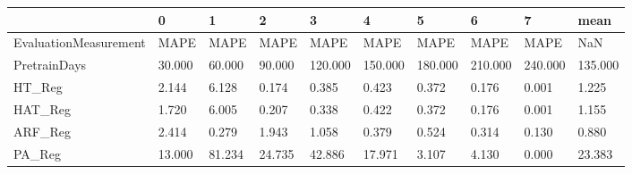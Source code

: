 \begin{tabular}{llllllllll}
\toprule
{} &      0 &      1 &      2 &       3 &       4 &       5 &       6 &       7 &    mean \\
\midrule
EvaluationMeasurement &   MAPE &   MAPE &   MAPE &    MAPE &    MAPE &    MAPE &    MAPE &    MAPE &     NaN \\
PretrainDays          & 30.000 & 60.000 & 90.000 & 120.000 & 150.000 & 180.000 & 210.000 & 240.000 & 135.000 \\
HT\_Reg                &  2.144 &  6.128 &  0.174 &   0.385 &   0.423 &   0.372 &   0.176 &   0.001 &   1.225 \\
HAT\_Reg               &  1.720 &  6.005 &  0.207 &   0.338 &   0.422 &   0.372 &   0.176 &   0.001 &   1.155 \\
ARF\_Reg               &  2.414 &  0.279 &  1.943 &   1.058 &   0.379 &   0.524 &   0.314 &   0.130 &   0.880 \\
PA\_Reg                & 13.000 & 81.234 & 24.735 &  42.886 &  17.971 &   3.107 &   4.130 &   0.000 &  23.383 \\
\bottomrule
\end{tabular}
